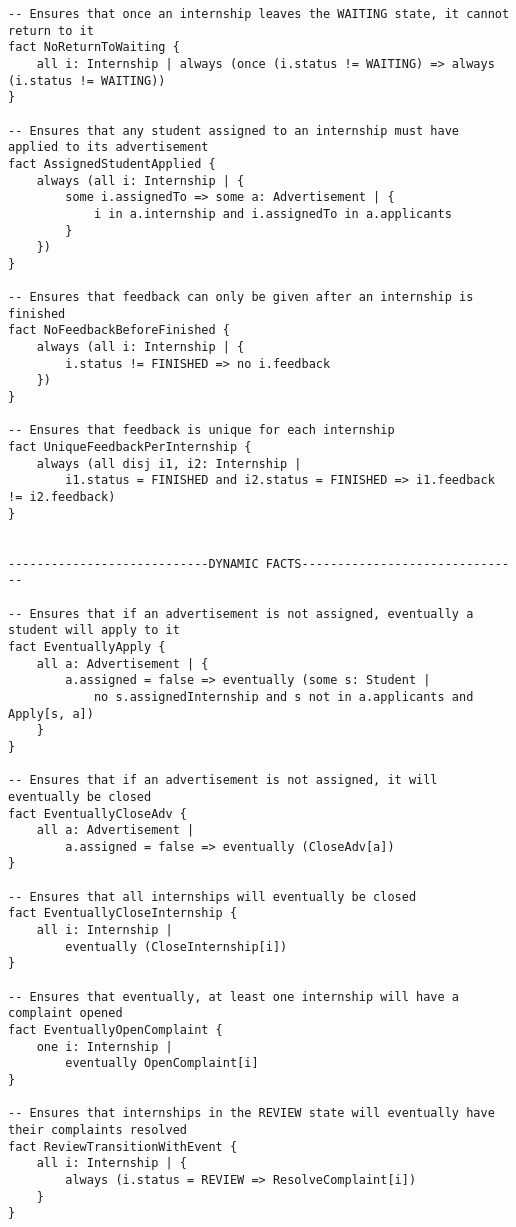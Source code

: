 \begin{lstlisting}
-- Ensures that once an internship leaves the WAITING state, it cannot return to it
fact NoReturnToWaiting {
    all i: Internship | always (once (i.status != WAITING) => always (i.status != WAITING))
}

-- Ensures that any student assigned to an internship must have applied to its advertisement
fact AssignedStudentApplied {
    always (all i: Internship | {
        some i.assignedTo => some a: Advertisement | {
            i in a.internship and i.assignedTo in a.applicants
        }
    })
}

-- Ensures that feedback can only be given after an internship is finished
fact NoFeedbackBeforeFinished {
    always (all i: Internship | {
        i.status != FINISHED => no i.feedback
    })
}

-- Ensures that feedback is unique for each internship
fact UniqueFeedbackPerInternship {
    always (all disj i1, i2: Internship | 
        i1.status = FINISHED and i2.status = FINISHED => i1.feedback != i2.feedback)
}


----------------------------DYNAMIC FACTS-------------------------------

-- Ensures that if an advertisement is not assigned, eventually a student will apply to it
fact EventuallyApply {
    all a: Advertisement | {
        a.assigned = false => eventually (some s: Student | 
            no s.assignedInternship and s not in a.applicants and Apply[s, a])
    }
}

-- Ensures that if an advertisement is not assigned, it will eventually be closed
fact EventuallyCloseAdv {
    all a: Advertisement |
        a.assigned = false => eventually (CloseAdv[a])
}

-- Ensures that all internships will eventually be closed
fact EventuallyCloseInternship {
    all i: Internship |
        eventually (CloseInternship[i])
}

-- Ensures that eventually, at least one internship will have a complaint opened
fact EventuallyOpenComplaint {
    one i: Internship | 
        eventually OpenComplaint[i]
}

-- Ensures that internships in the REVIEW state will eventually have their complaints resolved
fact ReviewTransitionWithEvent {
    all i: Internship | {
        always (i.status = REVIEW => ResolveComplaint[i])
    }
}




\end{lstlisting}
    
